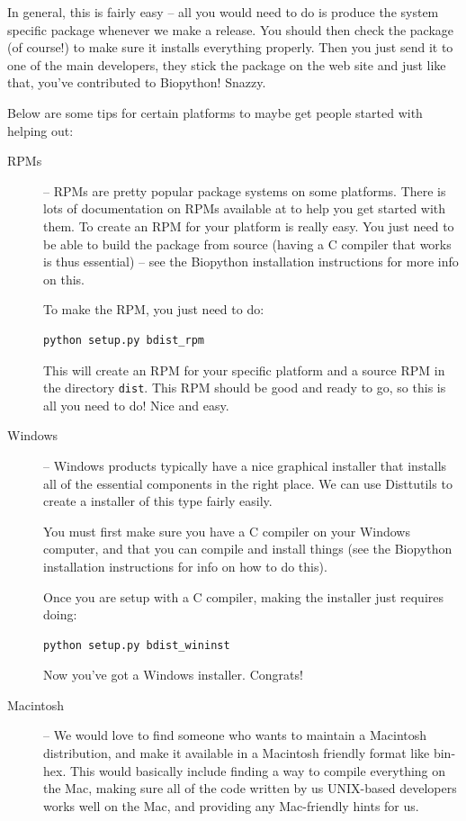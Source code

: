 \documentclass{report}
\begin{document}
In general, this is fairly easy -- all you would need to do is produce the system specific package whenever we make a release. You should then check the package (of course!) to make sure it installs everything properly. Then you just send it to one of the main developers, they stick the package on the web site and just like that, you've contributed to Biopython! Snazzy.


Below are some tips for certain platforms to maybe get people started with helping out:

\begin{description}
  \item[RPMs] -- RPMs are pretty popular package systems on some platforms. There is lots of documentation on RPMs available at  to help you get started with them. To create an RPM for your platform is really easy. You just need to be able to build the package from source (having a C compiler that works is thus essential) -- see the Biopython installation instructions for more info on this.


To make the RPM, you just need to do:

\begin{verbatim}
python setup.py bdist_rpm
\end{verbatim}

This will create an RPM for your specific platform and a source RPM in the directory \verb|dist|. This RPM should be good and ready to go, so this is all you need to do! Nice and easy.

\item[Windows] -- Windows products typically have a nice graphical installer that installs all of the essential components in the right place. We can use Disttutils to create a installer of this type fairly easily.


You must first make sure you have a C compiler on your Windows computer, and that you can compile and install things (see the Biopython installation instructions for info on how to do this).


Once you are setup with a C compiler, making the installer just requires doing:

\begin{verbatim}
python setup.py bdist_wininst
\end{verbatim}

Now you've got a Windows installer. Congrats!

\item[Macintosh] -- We would love to find someone who wants to maintain a Macintosh distribution, and make it available in a Macintosh friendly format like bin-hex. This would basically include finding a way to compile everything on the Mac, making sure all of the code written by us UNIX-based developers works well on the Mac, and providing any Mac-friendly hints for us.

\end{description}
\end{document}
